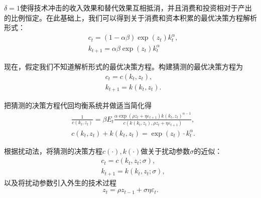 $\delta=1$使得技术冲击的收入效果和替代效果互相抵消，并且消费和投资相对于产出的比例恒定。在此基础上，我们可以得到关于消费和资本积累的最优决策方程解析形式：
\begin{equation}
  \label{eq:pta-optimal-decision-rules-ana-c}
  \begin{split}
    &c_t = \left(1-\alpha \beta \right) \exp(z_t) k_t^{\alpha}, \\
    &k_{t+1} = \alpha \beta \exp(z_t) k_{t}^{\alpha}
  \end{split}
\end{equation}

现在，假定我们不知道解析形式的最优决策方程。构建猜测的最优决策方程为
\begin{equation*}
  \begin{split}
    &c_t =c(k_t,z_t),\\
    &k_{t+1} = k(k_t,z_t).
  \end{split}
\end{equation*}

把猜测的决策方程代回均衡系统并做适当简化得
\begin{equation}
\label{eq:pta-ncgt-quilibrium}
  \begin{split}
    &\frac{1}{c(k_t,z_t)} = \beta E_t \frac{
    \alpha \exp \left( \rho z_{t} + \eta \varepsilon_{t+1} \right) k(k_t,z_t)^{\alpha - 1}
    }{
    c\left(k(k_t,z_t),\rho z_{t} + \eta \varepsilon_{t+1}\right)
    }, \\
    & c(k_t,z_t) + k(k_t,z_t) = \exp(z_t) \cdot k_t^{\alpha}.
  \end{split}
\end{equation}

根据扰动法，将猜测的决策方程$c(\cdot),k(\cdot)$做关于扰动参数$\sigma$的近似：
\begin{equation*}
  \begin{split}
    &c_t = c(k_t,z_t;\sigma),\\
    &k_{t+1} = k(k_t,z_t;\sigma),
  \end{split}
\end{equation*}
以及将扰动参数引入外生的技术过程
\begin{equation*}
  z_t = \rho z_{t-1} + \sigma \eta \varepsilon_t.
\end{equation*}

